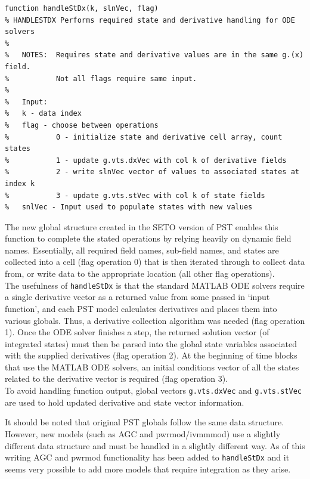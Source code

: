 \documentclass[12pt]{article}
\begin{document}
\begin{verbatim}
function handleStDx(k, slnVec, flag)
% HANDLESTDX Performs required state and derivative handling for ODE solvers
%
%   NOTES:  Requires state and derivative values are in the same g.(x) field.
%           Not all flags require same input.
%
%   Input:
%   k - data index
%   flag - choose between operations
%           0 - initialize state and derivative cell array, count states
%           1 - update g.vts.dxVec with col k of derivative fields
%           2 - write slnVec vector of values to associated states at index k
%           3 - update g.vts.stVec with col k of state fields
%   snlVec - Input used to populate states with new values
\end{verbatim}

The new global structure created in the SETO version of PST enables this function to complete the stated operations by relying heavily on dynamic field names. 
Essentially, all required field names, sub-field names, and states are collected into a cell (flag operation 0) that is then iterated through to collect data from, or write data to the appropriate location (all other flag operations).\\

The usefulness of \verb|handleStDx| is that the standard MATLAB ODE solvers require a single derivative vector as a returned value from some passed in `input function', and each PST model calculates derivatives and places them into various globals. 
Thus, a derivative collection algorithm was needed (flag operation 1).
Once the ODE solver finishes a step, the returned solution vector (of integrated states) must then be parsed into the global state variables associated with the supplied derivatives (flag operation 2).
At the beginning of time blocks that use the MATLAB ODE solvers, an initial conditions vector of all the states related to the derivative vector is required (flag operation 3).\\

To avoid handling function output, global vectors \verb|g.vts.dxVec| and \verb|g.vts.stVec| are used to hold updated derivative and state vector information.

It should be noted that original PST globals follow the same data structure.
However, new models (such as AGC and pwrmod/ivmmmod) use a slightly different data structure and must be handled in a slightly different way.
As of this writing AGC and pwrmod functionality has been added to \verb|handleStDx| and it seems very possible to add more models that require integration as they arise.
\end{document}
